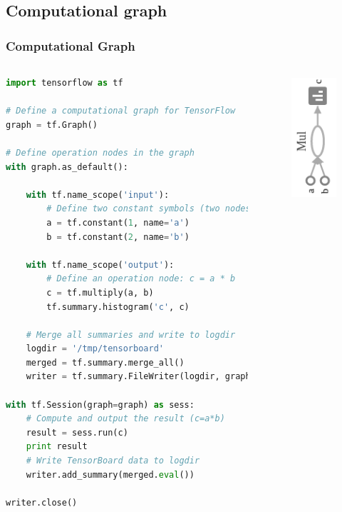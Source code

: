 \subsection{Computational graph}

\begin{frame}[fragile]
  \MyLogo
  \frametitle{Computational Graph}  
%
\vskip -5pt
\begin{columns}
\begin{lstlisting}[language=python]
import tensorflow as tf

# Define a computational graph for TensorFlow
graph = tf.Graph()

# Define operation nodes in the graph
with graph.as_default():

    with tf.name_scope('input'):
        # Define two constant symbols (two nodes)
        a = tf.constant(1, name='a')
        b = tf.constant(2, name='b')

    with tf.name_scope('output'):
        # Define an operation node: c = a * b
        c = tf.multiply(a, b)
        tf.summary.histogram('c', c)
    
    # Merge all summaries and write to logdir
    logdir = '/tmp/tensorboard'
    merged = tf.summary.merge_all()
    writer = tf.summary.FileWriter(logdir, graph)

with tf.Session(graph=graph) as sess:
    # Compute and output the result (c=a*b)
    result = sess.run(c)
    print result
    # Write TensorBoard data to logdir
    writer.add_summary(merged.eval())

writer.close()
\end{lstlisting}

\pause

%
\begin{figure}[htbp] 
   \includegraphics[height=1.8in]{figures/compgraph.png} 
\end{figure}
%
\end{columns}

\end{frame}

